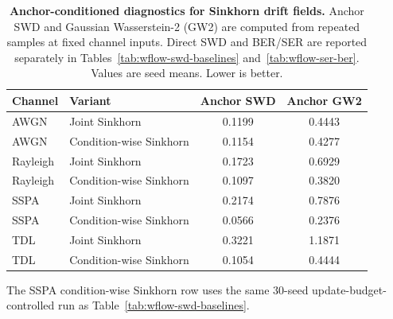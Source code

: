 \begin{table}[!t]
\centering
\caption{\textbf{Anchor-conditioned diagnostics for Sinkhorn drift fields.} Anchor SWD and Gaussian Wasserstein-2 (GW2) are computed from repeated samples at fixed channel inputs. Direct SWD and BER/SER are reported separately in Tables~\ref{tab:wflow-swd-baselines} and~\ref{tab:wflow-ser-ber}. Values are seed means. Lower is better.}
\label{tab:wflow-conditional-metrics}
\tablefontsize
\begin{tabular}{@{}llcc@{}}
\toprule
Channel & Variant & Anchor SWD & Anchor GW2 \\
\midrule
AWGN & Joint Sinkhorn & 0.1199 & 0.4443 \\
AWGN & Condition-wise Sinkhorn & 0.1154 & 0.4277 \\
\midrule
Rayleigh & Joint Sinkhorn & 0.1723 & 0.6929 \\
Rayleigh & Condition-wise Sinkhorn & 0.1097 & 0.3820 \\
\midrule
SSPA & Joint Sinkhorn & 0.2174 & 0.7876 \\
SSPA & Condition-wise Sinkhorn & 0.0566 & 0.2376 \\
\midrule
TDL & Joint Sinkhorn & 0.3221 & 1.1871 \\
TDL & Condition-wise Sinkhorn & 0.1054 & 0.4444 \\
\bottomrule
\end{tabular}
\par\vspace{0.25em}
\begin{minipage}{0.92\columnwidth}
\footnotesize\raggedright
The SSPA condition-wise Sinkhorn row uses the same \(30\)-seed update-budget-controlled run as Table~\ref{tab:wflow-swd-baselines}.
\end{minipage}
\end{table}
